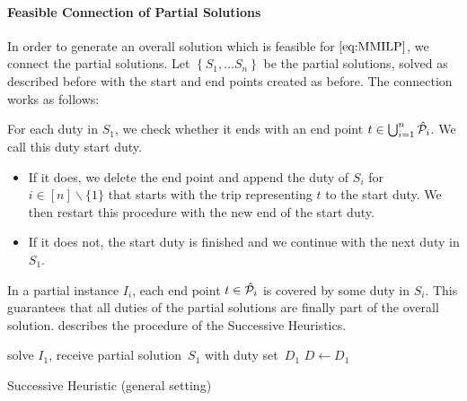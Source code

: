 \paragraph{Feasible Connection of Partial Solutions} \parfill

In order to generate an overall solution which is feasible for $\eqref{eq:MMILP}$, we connect the partial solutions. Let ${\left\{S_1,\dots S_n\right\}}$ be the partial solutions, solved as described before with the start and end points created as before. The connection works as follows:

For each duty in $S_1$, we check whether it ends with an end point $t\in\bigcup_{i=1}^n\hat{\mathcal{P}}_i$. We call this duty start duty.
\begin{itemize}
	\item
		If it does, we delete the end point and append the duty of $S_i$ for ${i\in[n]\backslash\{1\}}$ that starts with the trip representing $t$ to the start duty. We then restart this procedure with the new end of the start duty.
	\item
		If it does not, the start duty is finished and we continue with the next duty in $S_1$.
\end{itemize}

In a partial instance $I_i$, each end point ${t\in\hat{\mathcal{P}}_i}$ is covered by some duty in $S_i$. This guarantees that all duties of the partial solutions are finally part of the overall solution.  describes the procedure of the Successive Heuristics.

\begin{algorithm}[htb]
	\SetAlgoLined
	solve $I_1$, receive partial solution~$S_1$ with duty set~$D_1$\;
	$D\gets D_1$\;
	\caption{Successive Heuristic (general setting)}
	\label{alg:successive_heuristic}
\end{algorithm}

